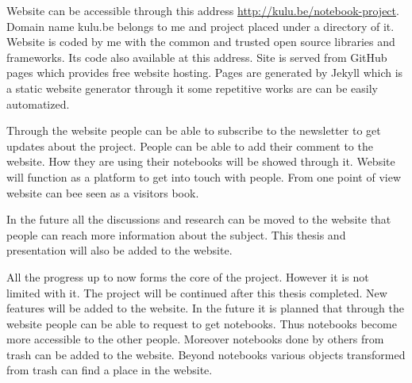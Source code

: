 
Website can be accessible through this address \url{http://kulu.be/notebook-project}. Domain name kulu.be belongs to me and project placed under a directory of it. Website is coded by me with the common and trusted open source libraries and frameworks. Its code also available at this address. Site is served from GitHub pages which provides free website hosting. Pages are generated by Jekyll which is a static website generator through it some repetitive works are can be easily automatized. 

Through the website people can be able to subscribe to the newsletter to get updates about the project. People can be able to add their comment to the website. How they are using their notebooks will be showed through it. Website will function as a platform to get into touch with people. From one point of view website can bee seen as a visitors book.

In the future all the discussions and research can be moved to the website that people can reach more information about the subject. This thesis and presentation will also be added to the website. 

All the progress up to now forms the core of the project. However it is not limited with it. The project will be continued after this thesis completed. New features will be added to the website. In the future it is planned that through the website people can be able to request to get notebooks. Thus notebooks become more accessible to the other people. Moreover notebooks done by others from trash can be added to the website. Beyond notebooks various objects transformed from trash can find a place in the website.

